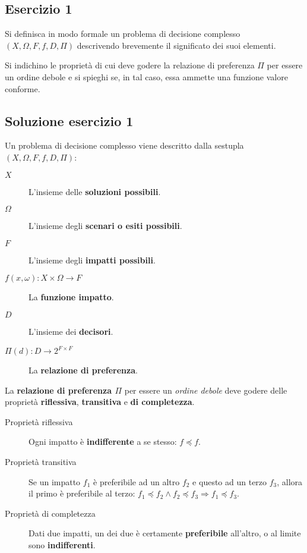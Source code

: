 \documentclass[\main/main.tex]{subfiles}
\begin{document}
\subsection{Esercizio 1}
Si definisca in modo formale un problema di decisione complesso $(X, \Omega, F, f, D, \Pi)$ descrivendo brevemente il significato dei suoi elementi.

Si indichino le proprietà di cui deve godere la relazione di preferenza $\Pi$ per essere un ordine debole e si spieghi se, in tal caso, essa ammette una funzione valore conforme.

\subsection{Soluzione esercizio 1}
Un problema di decisione complesso viene descritto dalla sestupla $(X, \Omega, F, f, D, \Pi)$:

\begin{description}
  \item [$X$] L'insieme delle \textbf{soluzioni possibili}.
  \item [$\Omega$] L'insieme degli \textbf{scenari o esiti possibili}.
  \item [$F$] L'insieme degli \textbf{impatti possibili}.
  \item [$f(x, \omega): X \times \Omega  \rightarrow F$] La \textbf{funzione impatto}.
  \item [$D$] L'insieme dei \textbf{decisori}.
  \item [$\Pi(d): D \rightarrow 2^{F\times F}$] La \textbf{relazione di preferenza}.
\end{description}

\vspace{5mm}

La \textbf{relazione di preferenza $\Pi$} per essere un \textit{ordine debole} deve godere delle proprietà \textbf{riflessiva}, \textbf{transitiva} e \textbf{di completezza}.

\begin{description}
  \item [Proprietà riflessiva] Ogni impatto è \textbf{indifferente} a se stesso: $f \preceq f$.
  \item [Proprietà transitiva] Se un impatto $f_1$ è preferibile ad un altro $f_2$ e questo ad un terzo $f_3$, allora il primo è preferibile al terzo: $f_1 \preceq f_2 \land f_2 \preceq f_3 \Rightarrow f_1 \preceq f_3$.
  \item [Proprietà di completezza] Dati due impatti, un dei due è certamente \textbf{preferibile} all'altro, o al limite sono \textbf{indifferenti}.
\end{description}
\end{document}
